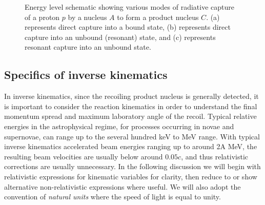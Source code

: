 \begin{figure}
\caption{Energy level schematic showing various modes of radiative capture of a proton $p$ by a nucleus $A$ to form a product nucleus $C$. (a) represents direct capture into a bound state, (b) represents direct capture into an unbound (resonant) state, and (c) represents resonant capture into an unbound state.}
\label{fig:radcap}       %
\end{figure}


\subsection{Specifics of inverse kinematics}

In inverse kinematics, since the recoiling product nucleus is generally detected, it is important to consider the reaction kinematics in order to understand the final momentum spread and maximum laboratory angle of the recoil. Typical relative energies in the astrophysical regime, for processes occurring in novae and supernovae, can range up to the several hundred keV to MeV range. With typical inverse kinematics accelerated beam energies ranging up to around 2A MeV, the resulting beam velocities are usually below around $0.05c$, and thus relativistic corrections are usually unnecessary. In the following discussion we will begin with relativistic expressions for kinematic variables for clarity, then reduce to or show alternative non-relativistic expressions where useful. We will also adopt the convention of {\em natural units} where the speed of light is equal to unity.

